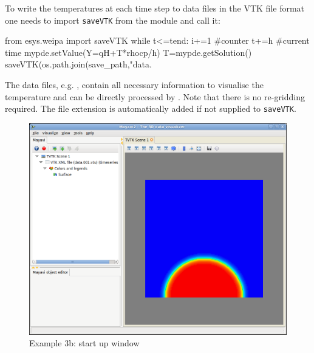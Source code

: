 To write the temperatures at each time step to data files in the VTK file format
one needs to import \verb|saveVTK| from the \weipa module and call it:
\begin{python}
from esys.weipa import saveVTK
while t<=tend:
      i+=1 #counter
      t+=h #current time
      mypde.setValue(Y=qH+T*rhocp/h)
      T=mypde.getSolution()
      saveVTK(os.path.join(save_path,"data.%
\end{python}
The data files, e.g. , contain all necessary information to 
visualise the temperature and can be directly processed by \mayavi. Note that
there is no re-gridding required. The file extension  is
automatically added if not supplied to \verb|saveVTK|. 

\begin{figure}[ht]
\centerline{\includegraphics[width=4.in]{figures/ScreeshotMayavi2n1}}
\caption{Example 3b: \mayavi start up window}
\label{fig:mayavi window}
\end{figure}

